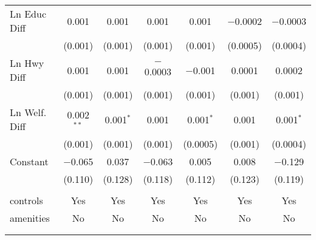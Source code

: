 \begin{table}[!htbp]
\begin{tabular}{@{\extracolsep{5pt}}lcccccc}
  Ln Educ Diff & 0.001 & 0.001 & 0.001 & 0.001 & $-$0.0002 & $-$0.0003 \\ 
  & (0.001) & (0.001) & (0.001) & (0.001) & (0.0005) & (0.0004) \\ 
  Ln Hwy Diff & 0.001 & 0.001 & $-$0.0003 & $-$0.001 & 0.0001 & 0.0002 \\ 
  & (0.001) & (0.001) & (0.001) & (0.001) & (0.001) & (0.001) \\ 
  Ln Welf. Diff & 0.002$^{**}$ & 0.001$^{*}$ & 0.001 & 0.001$^{*}$ & 0.001 & 0.001$^{*}$ \\ 
  & (0.001) & (0.001) & (0.001) & (0.0005) & (0.001) & (0.0004) \\ 
  Constant & $-$0.065 & 0.037 & $-$0.063 & 0.005 & 0.008 & $-$0.129 \\ 
  & (0.110) & (0.128) & (0.118) & (0.112) & (0.123) & (0.119) \\ 
 \hline \\[-1.8ex] 
controls & Yes & Yes & Yes & Yes & Yes & Yes \\ 
amenities & No & No & No & No & No & No \\ 
\hline \\[-1.8ex] 
\hline 
\hline \\[-1.8ex] 
\end{tabular} 
\end{table} 
